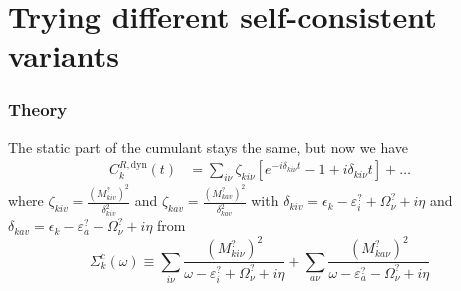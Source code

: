 \section{Trying different self-consistent variants }
\begin{frame}
    \frametitle{Theory}
The static part of the cumulant stays the same, but now we have 
\begin{align}
C_k^{R,\text{dyn}}(t)
&=
\sum_{i\nu} \zeta_{ki\nu} \left[ e^{-i\delta_{ki\nu} t} - 1 + i\delta_{ki\nu} t \right] + \ldots
\end{align}
where $\zeta_{k i v}=\frac{\left(M_{k i v}^?\right)^2}{\delta_{k i v}^2}$ and $\zeta_{k a v}=\frac{\left(M_{k a v}^?\right)^2}{\delta_{k a v}^2}$ with $\delta_{k i v} = \epsilon_k - \varepsilon_i^? + \Omega_\nu^? + i \eta$ and $\delta_{k a v} = \epsilon_k - \varepsilon_a^? - \Omega_\nu^? + i \eta$ \pause from
\begin{equation}
    \Sigma _k^{c}(\omega)\equiv\sum_{i\nu} \frac{\left(M_{ki\nu}^?\right)^2}{\omega  - \varepsilon_i^{?} + \Omega_\nu^? + i \eta} + \sum_{a\nu} \frac{\left(M_{ka\nu}^?\right)^2}{\omega  - \varepsilon_a^{?} - \Omega_\nu^? + i \eta}
\end{equation}
\end{frame}
